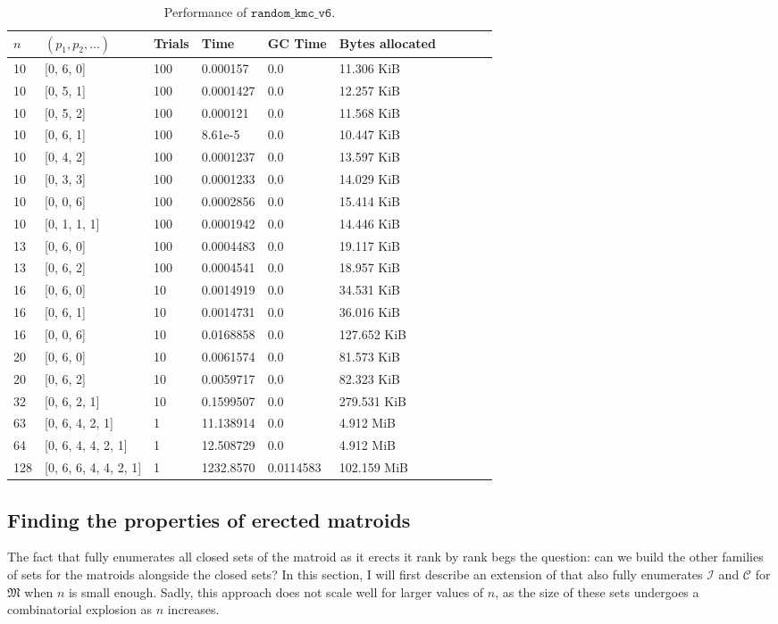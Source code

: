 \begin{table}[ht!]
  \centering
  \caption{Performance of $\texttt{random\_kmc\_v6}$.}
  \label{tab:perf_v6}
    \begin{tabular}{llllllllll}
      \toprule
      $n$ & $(p_1, p_2, \ldots)$ & Trials & Time  & GC Time & Bytes allocated \\
      \midrule
      10 & [0, 6, 0] & 100 & 0.000157 & 0.0 & 11.306 KiB \\
      10 & [0, 5, 1] & 100 & 0.0001427 & 0.0 & 12.257 KiB \\
      10 & [0, 5, 2] & 100 & 0.000121 & 0.0 & 11.568 KiB \\
      10 & [0, 6, 1] & 100 & 8.61e-5 & 0.0 & 10.447 KiB \\
      10 & [0, 4, 2] & 100 & 0.0001237 & 0.0 & 13.597 KiB \\
      10 & [0, 3, 3] & 100 & 0.0001233 & 0.0 & 14.029 KiB \\
      10 & [0, 0, 6] & 100 & 0.0002856 & 0.0 & 15.414 KiB \\
      10 & [0, 1, 1, 1] & 100 & 0.0001942 & 0.0 & 14.446 KiB \\
      13 & [0, 6, 0] & 100 & 0.0004483 & 0.0 & 19.117 KiB \\
      13 & [0, 6, 2] & 100 & 0.0004541 & 0.0 & 18.957 KiB \\
      16 & [0, 6, 0] & 10 & 0.0014919 & 0.0 & 34.531 KiB \\
      16 & [0, 6, 1] & 10 & 0.0014731 & 0.0 & 36.016 KiB \\
      16 & [0, 0, 6] & 10 & 0.0168858 & 0.0 & 127.652 KiB \\
      20 & [0, 6, 0] & 10 & 0.0061574 & 0.0 & 81.573 KiB \\
      20 & [0, 6, 2] & 10 & 0.0059717 & 0.0 & 82.323 KiB \\
      32 & [0, 6, 2, 1] & 10 & 0.1599507 & 0.0 & 279.531 KiB \\
      63 & [0, 6, 4, 2, 1] & 1 & 11.138914 & 0.0 & 4.912 MiB \\
      64 & [0, 6, 4, 4, 2, 1] & 1 & 12.508729 & 0.0 & 4.912 MiB \\
      128 & [0, 6, 6, 4, 4, 2, 1] & 1 & 1232.8570 & 0.0114583 & 102.159 MiB \\
      \bottomrule
    \end{tabular}
\end{table}
\skelpar

\subsection{Finding the properties of erected matroids}
The fact that  fully enumerates all closed sets of the matroid as it erects it rank by rank begs the question: can we build the other families of sets for the matroids alongside the closed sets? In this section, I will first describe an extension of  that also fully enumerates $\mathcal{I}$ and $\mathcal{C}$ for $\mathfrak{M}$ when $n$ is small enough. Sadly, this approach does not scale well for larger values of $n$, as the size of these sets undergoes a combinatorial explosion as $n$ increases. 


